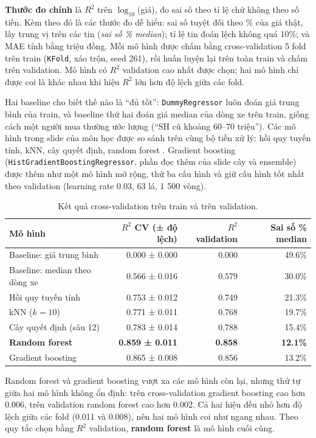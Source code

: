 \textbf{Thước đo chính} là $R^2$ trên $\log_{10}$(giá), đo sai số theo tỉ lệ chứ không theo số tiền. Kèm theo đó là các
thước đo dễ hiểu: sai số tuyệt đối theo \% của giá thật, lấy trung vị trên các tin (\textit{sai số \% median}); tỉ lệ
tin đoán lệch không quá 10\%; và MAE tính bằng triệu đồng. Mỗi mô hình được chấm bằng cross-validation 5 fold trên train
(\texttt{KFold}, xáo trộn, seed 261), rồi huấn luyện lại trên toàn train và chấm trên validation. Mô hình có $R^2$
validation cao nhất được chọn; hai mô hình chỉ được coi là khác nhau khi hiệu $R^2$ lớn hơn độ lệch giữa các fold.

Hai baseline cho biết thế nào là ``đủ tốt'': \texttt{DummyRegressor} luôn đoán giá trung bình của train, và baseline thứ
hai đoán giá median của dòng xe trên train, giống cách một người mua thường ước lượng (``SH cũ khoảng 60--70 triệu''). Các mô hình
trong slide của môn học được so sánh trên cùng bộ tiền xử lý: hồi quy tuyến tính, kNN, cây quyết định, random forest
\cite{tab-rf}. Gradient boosting (\texttt{HistGradientBoostingRegressor}, phần đọc thêm của slide cây và ensemble) được
thêm như một mô hình mở rộng, thử ba cấu hình và giữ cấu hình tốt nhất theo validation (learning rate 0.03, 63 lá,
1 500 vòng).

\begin{table}[H]\centering
\caption{Kết quả cross-validation trên train và trên validation.}\label{tab:tab-val}
\begin{tabular}{lrrr}
\toprule
Mô hình & $R^2$ CV (± độ lệch) & $R^2$ validation & Sai số \% median \\
\midrule
Baseline: giá trung bình & 0.000 ± 0.000 & 0.000 & 49.6\% \\
Baseline: median theo dòng xe & 0.566 ± 0.016 & 0.579 & 30.0\% \\
Hồi quy tuyến tính & 0.753 ± 0.012 & 0.749 & 21.3\% \\
kNN ($k=10$) & 0.771 ± 0.011 & 0.768 & 19.7\% \\
Cây quyết định (sâu 12) & 0.783 ± 0.014 & 0.788 & 15.4\% \\
\textbf{Random forest} & \textbf{0.859 ± 0.011} & \textbf{0.858} & \textbf{12.1\%} \\
Gradient boosting & 0.865 ± 0.008 & 0.856 & 13.2\% \\
\bottomrule
\end{tabular}
\end{table}

Random forest và gradient boosting vượt xa các mô hình còn lại, nhưng thứ tự giữa hai mô hình không ổn định: trên
cross-validation gradient boosting cao hơn 0.006, trên validation random forest cao hơn 0.002. Cả hai hiệu đều nhỏ hơn độ
lệch giữa các fold (0.011 và 0.008), nên hai mô hình coi như ngang nhau. Theo quy tắc chọn bằng $R^2$ validation,
\textbf{random forest} là mô hình cuối cùng.

